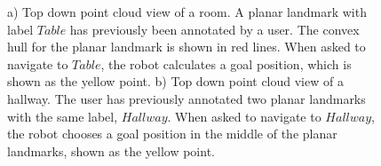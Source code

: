 \documentclass{tADR2e}
\begin{document}
\begin{figure}[ht!]
\centering
%
\caption{a) Top down point cloud view of a room. A planar landmark with label $Table$ has previously been annotated by a user. The convex hull for the planar landmark is shown in red lines. When asked to navigate to $Table$, the robot calculates a goal position, which is shown as the yellow point. b) Top down point cloud view of a hallway. The user has previously annotated two planar landmarks with the same label, $Hallway$. When asked to navigate to $Hallway$, the robot chooses a goal position in the middle of the planar landmarks, shown as the yellow point.}
\label{fig:navigation_plane_examples}
\end{figure}
\end{document}
